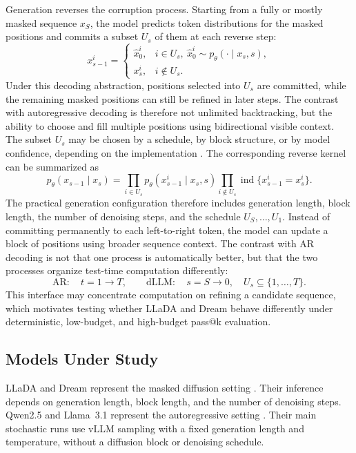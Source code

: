 Generation reverses the corruption process. Starting from a fully or mostly
masked sequence $x_S$, the model predicts token distributions for the masked
positions and commits a subset $U_s$ of them at each reverse step:
\begin{equation}
    x_{s-1}^i =
    \begin{cases}
    \hat{x}_0^i, & i\in U_s,\ \hat{x}_0^i\sim p_\theta(\cdot\mid x_s,s),\\
    x_s^i, & i\notin U_s.
    \end{cases}
\end{equation}
Under this decoding abstraction, positions selected into \(U_s\) are committed,
while the remaining masked positions can still be refined in later steps. The
contrast with autoregressive decoding is therefore not unlimited backtracking,
but the ability to choose and fill multiple positions using bidirectional
visible context.
The subset $U_s$ may be chosen by a schedule, by block structure, or by model
confidence, depending on the implementation \cite{nie2025llada,ye2025dream}.
The corresponding reverse kernel can be summarized as
\begin{equation}
    p_\theta(x_{s-1}\mid x_s)
    =
    \prod_{i\in U_s}p_\theta(x_{s-1}^i\mid x_s,s)
    \prod_{i\notin U_s}\operatorname{ind}\{x_{s-1}^i=x_s^i\}.
\end{equation}
The practical generation configuration therefore includes generation length,
block length, the number of denoising steps, and the schedule
$U_S,\ldots,U_1$. Instead of committing permanently to each left-to-right token,
the model can update a block of positions using broader sequence context. The
contrast with AR decoding is not that one process is automatically better, but
that the two processes organize test-time computation differently:
\begin{equation}
    \mathrm{AR:}\quad t=1\rightarrow T,
    \qquad
    \mathrm{dLLM:}\quad s=S\rightarrow 0,\quad U_s\subseteq\{1,\ldots,T\}.
\end{equation}
This interface may concentrate computation on refining a candidate sequence,
which motivates testing whether LLaDA and Dream behave differently under
deterministic, low-budget, and high-budget pass@k evaluation.

\subsection{Models Under Study}
LLaDA and Dream represent the masked diffusion setting
\cite{nie2025llada,ye2025dream}. Their inference depends on generation length,
block length, and the number of denoising steps. Qwen2.5 and Llama~3.1
represent the autoregressive setting \cite{qwen2024qwen25,grattafiori2024llama}.
Their main stochastic runs use vLLM sampling with a fixed generation length and
temperature, without a diffusion block or denoising schedule.

